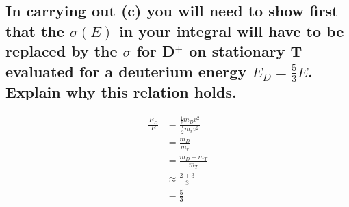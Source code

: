 \documentclass[answers]{exam}
\begin{document}
\begin{questions}
\begin{parts}
\part{In carrying out (c) you will need to show first that the $\sigma(E)$ in your integral will have to be replaced by the $\sigma$ for D$^+$ on stationary T evaluated for a deuterium energy $E_D = \frac{5}{3}E$. Explain why this relation holds.}

\begin{solution}
    \begin{align*}
        \frac{E_D}{E} &= \frac{\frac{1}{2}m_Dv^2}{\frac{1}{2}m_rv^2} \\
                      &= \frac{m_D}{m_r} \\
                      &= \frac{m_D+m_T}{m_T} \\
                      &\approx \frac{2+3}{3} \\
                      &= \frac{5}{3}
    \end{align*}
\end{solution}

\end{parts}

\end{questions}
\end{document}
